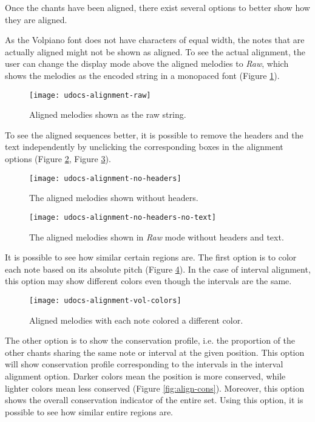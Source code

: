 Once the chants have been aligned, there exist several options to better show how they are aligned.

As the Volpiano font does not have characters of equal width, the notes that are actually aligned might not be shown as aligned. To see the
actual alignment, the user can change the display mode above the aligned melodies to \emph{Raw}, which shows the melodies as the encoded string
in a monopaced font (Figure \ref{fig:align-raw}).

\begin{figure}[!h]
\centering
\texttt{[image: udocs-alignment-raw]}
\caption{Aligned melodies shown as the raw string.}
\label{fig:align-raw}
\end{figure}

To see the aligned sequences better, it is possible to remove the headers and the text independently by unclicking the corresponding boxes
in the alignment options (Figure \ref{fig:align-no-headers}, Figure \ref{fig:align-no-text}).

\begin{figure}[!h]
\centering
\texttt{[image: udocs-alignment-no-headers]}
\caption{The aligned melodies shown without headers.}
\label{fig:align-no-headers}
\end{figure}

\begin{figure}[!h]
\centering
\texttt{[image: udocs-alignment-no-headers-no-text]}
\caption{The aligned melodies shown in \emph{Raw} mode without headers and text.}
\label{fig:align-no-text}
\end{figure}

It is possible to see how similar certain regions are. The first option is to color each note based on its absolute pitch (Figure \ref{fig:align-colors}).
In the case of interval alignment, this option may show different colors even though the intervals are the same.

\begin{figure}[!h]
\centering
\texttt{[image: udocs-alignment-vol-colors]}
\caption{Aligned melodies with each note colored a different color.}
\label{fig:align-colors}
\end{figure}

The other option is to show the conservation profile, i.e. the proportion of the other chants sharing the same note or interval at the given position. This option will show
conservation profile corresponding to the intervals in the interval alignment option. Darker colors mean the position is more conserved, while lighter colors mean less conserved
(Figure \ref{fig:align-cons}). Moreover, this option shows the overall conservation indicator of the entire set.
Using this option, it is possible to see how similar entire regions are.

